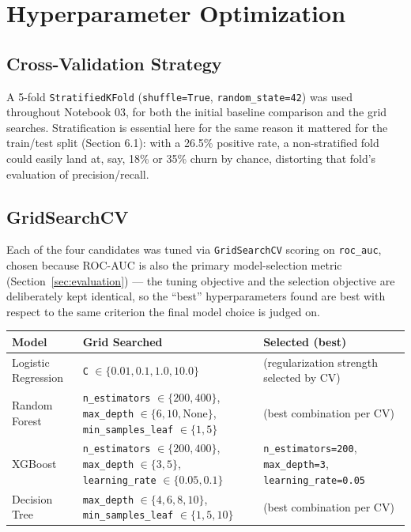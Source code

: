 \documentclass[11pt]{article}
\begin{document}
\section{Hyperparameter Optimization}
\label{sec:hyperparam}

\subsection{Cross-Validation Strategy}

A 5-fold \texttt{StratifiedKFold} (\texttt{shuffle=True}, \texttt{random\_state=42}) was used throughout Notebook 03, for both the initial baseline comparison and the grid searches. Stratification is essential here for the same reason it mattered for the train/test split (Section 6.1): with a 26.5\% positive rate, a non-stratified fold could easily land at, say, 18\% or 35\% churn by chance, distorting that fold's evaluation of precision/recall.

\subsection{GridSearchCV}

Each of the four candidates was tuned via \texttt{GridSearchCV} scoring on \texttt{roc\_auc}, chosen because ROC-AUC is also the primary model-selection metric (Section~\ref{sec:evaluation}) --- the tuning objective and the selection objective are deliberately kept identical, so the ``best'' hyperparameters found are best with respect to the same criterion the final model choice is judged on.

\begin{center}
\begin{tabularx}{\textwidth}{@{}l X X@{}}
\toprule
\textbf{Model} & \textbf{Grid Searched} & \textbf{Selected (best)} \\
\midrule
Logistic Regression & \texttt{C} $\in \{0.01, 0.1, 1.0, 10.0\}$ & (regularization strength selected by CV) \\
Random Forest & \texttt{n\_estimators} $\in \{200, 400\}$, \texttt{max\_depth} $\in \{6, 10, \text{None}\}$, \texttt{min\_samples\_leaf} $\in \{1, 5\}$ & (best combination per CV) \\
XGBoost & \texttt{n\_estimators} $\in \{200, 400\}$, \texttt{max\_depth} $\in \{3, 5\}$, \texttt{learning\_rate} $\in \{0.05, 0.1\}$ & \texttt{n\_estimators=200}, \texttt{max\_depth=3}, \texttt{learning\_rate=0.05} \\
Decision Tree & \texttt{max\_depth} $\in \{4,6,8,10\}$, \texttt{min\_samples\_leaf} $\in \{1,5,10\}$ & (best combination per CV) \\
\bottomrule
\end{tabularx}
\end{center}
\end{document}
